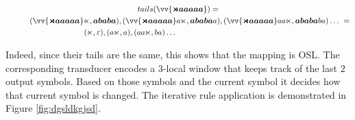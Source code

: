 \begin{multline*}
tails(\vv{\bm{\bow aaaaa}}) = \\
\qquad \shoveleft{(\vv{\bm{\bow aaaaa}}\eow, \bm{ababa}), (\vv{\bm{\bow aaaaa}}a\eow, \bm{ababa}a), (\vv{\bm{\bow aaaaa}}aa\eow, \bm{ababa}ba) \dots~ =}  \\
 \qquad\qquad\qquad\qquad\quad \shoveleft{(\eow, \varepsilon), (a\eow, a), (aa\eow, ba) \dots}
\end{multline*}

Indeed, since their tails are the same, this shows that the mapping is OSL.
The corresponding transducer encodes a $3$-local window that keeps track of the last $2$ output symbols.
Based on those symbols and the current symbol it decides how that current symbol is changed.
The iterative rule application is demonstrated in Figure \ref{fig:dgsldkgjsd}.



